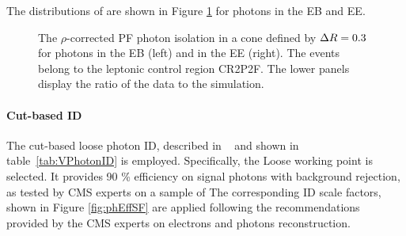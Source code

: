 The distributions of \sieie are shown in Figure \ref{fig:sieie_CR2P2F} for photons in the EB and EE.

\begin{figure}
%
\caption{The $\rho$-corrected PF photon isolation in a cone defined by $\Delta R = 0.3$ for photons in the EB (left) and in the EE (right).
The events belong to the leptonic control region CR2P2F.
The lower panels display the ratio of the data to the simulation.}
\label{fig:sieie_CR2P2F}
\end{figure}

\paragraph{Cut-based ID\\}
The cut-based loose photon ID, described in ~\cite{CMS:EGM-17-001} and shown in table~\ref{tab:VPhotonID} is employed.
Specifically, the Loose working point is selected.
It provides 90 \% efficiency on signal photons with  background rejection, as tested by CMS experts on a sample of 
The corresponding ID scale factors, shown in Figure \ref{fig:phEffSF} are applied following the recommendations provided by the CMS experts on electrons and photons reconstruction.

\begin{table}
  \caption[.]{Cut thresholds of the Loose working point cut-based photon ID.}
  \label{tab:VPhotonID}
\end{table}

